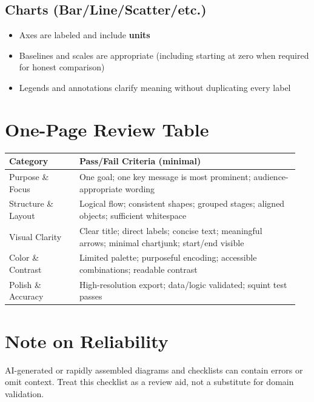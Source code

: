 \documentclass[11pt]{article}
\begin{document}
\subsection{Charts (Bar/Line/Scatter/etc.)}
\begin{itemize}
  \item Axes are labeled and include \textbf{units}
  \item Baselines and scales are appropriate (including starting at zero when required for honest comparison)
  \item Legends and annotations clarify meaning without duplicating every label
\end{itemize}

\section{One-Page Review Table}
\begin{center}
\small
\begin{tabular}{@{}p{0.23\linewidth} p{0.72\linewidth}@{}}
\toprule
\textbf{Category} & \textbf{Pass/Fail Criteria (minimal)} \\
\midrule
Purpose \& Focus &
One goal; one key message is most prominent; audience-appropriate wording \\
Structure \& Layout &
Logical flow; consistent shapes; grouped stages; aligned objects; sufficient whitespace \\
Visual Clarity &
Clear title; direct labels; concise text; meaningful arrows; minimal chartjunk; start/end visible \\
Color \& Contrast &
Limited palette; purposeful encoding; accessible combinations; readable contrast \\
Polish \& Accuracy &
High-resolution export; data/logic validated; squint test passes \\
\bottomrule
\end{tabular}
\end{center}

\section{Note on Reliability}
AI-generated or rapidly assembled diagrams and checklists can contain errors or omit context. Treat this checklist as a review aid, not a substitute for domain validation.
\end{document}
